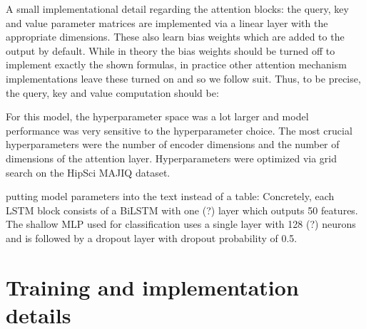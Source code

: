 A small implementational detail regarding the attention blocks: the query, key and value parameter matrices are implemented via a linear layer with the appropriate dimensions. These also learn bias weights which are added to the output by default. While in theory the bias weights should be turned off to implement exactly the shown formulas, in practice other attention mechanism implementations leave these turned on \cite{annotatedtransformer} and so we follow suit. Thus, to be precise, the query, key and value computation should be:

For this model, the hyperparameter space was a lot larger and model performance was very sensitive to the hyperparameter choice. The most crucial hyperparameters were the number of encoder dimensions and the number of dimensions of the attention layer. Hyperparameters were optimized via grid search on the HipSci MAJIQ dataset.

putting model parameters into the text instead of a table:
Concretely, each LSTM block consists of a BiLSTM with one (?) layer which outputs 50 features.
The shallow MLP used for classification uses a single layer with 128 (?) neurons and is followed by a dropout layer with dropout probability of 0.5.


\section{Training and implementation details} \label{sec:implementation_details}
